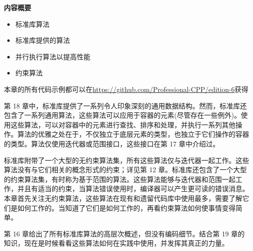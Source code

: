 \noindent
\textbf{内容概要}

\begin{itemize}
\item
标准库算法

\item
标准库提供的算法

\item
并行执行算法以提高性能

\item
约束算法
\end{itemize}

本章的所有代码示例都可以在\url{https://github.com/Professional-CPP/edition-6}获得

第 18 章中，标准库提供了一系列令人印象深刻的通用数据结构。然而，标准库还包含了一系列通用算法，这些算法可以应用于容器的元素(尽管存在一些例外)。使用这些算法，可以对容器中的元素进行查找、排序和处理，并执行一系列其他操作。算法的优雅之处在于，不仅独立于底层元素的类型，也独立于它们操作的容器的类型。算法仅使用迭代器或范围接口，这些接口在第 17 章中介绍过。

标准库附带了一个大型的无约束算法集，所有这些算法仅与迭代器一起工作。这些算法没有与它们相关的概念形式的约束；详见第 12 章。标准库还包含了一个大型的约束算法集，有时称为基于范围的算法。这些算法能够与迭代器和范围一起工作，并且有适当的约束，当算法错误使用时，编译器可以产生更可读的错误消息。本章首先关注无约束算法，这些算法在现有和遗留代码库中使用最多，需要了解它们是如何工作的。当知道了它们是如何工作的，再看约束算法如何使事情变得简单。

第 16 章给出了所有标准库算法的高层次概述，但没有编码细节。结合第 19 章的知识，现在是时候看看这些算法如何在实践中使用，并发挥其真正的力量。
